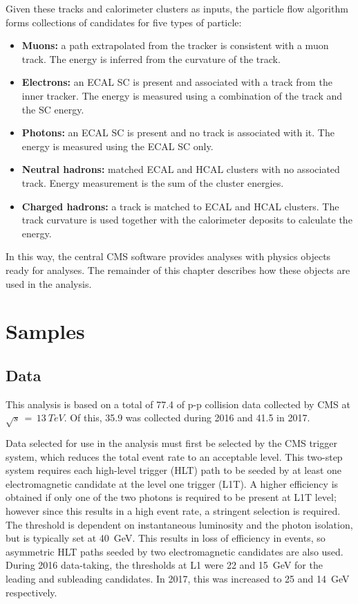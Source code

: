 \newpage
Given these tracks and calorimeter clusters as inputs, the particle flow algorithm forms collections of candidates for five types of particle:
\begin{itemize}
  \item{\textbf{Muons:} a path extrapolated from the tracker is consistent with a muon track. 
                        The energy is inferred from the curvature of the track.} %
  \item{\textbf{Electrons:} an ECAL SC is present and associated with a track from the inner tracker. 
                            The energy is measured using a combination of the track \pt and the SC energy.}
  \item{\textbf{Photons:} an ECAL SC is present and no track is associated with it.
                          The energy is measured using the ECAL SC only.}
  \item{\textbf{Neutral hadrons:} matched ECAL and HCAL clusters with no associated track.
                                 Energy measurement is the sum of the cluster energies.}
  \item{\textbf{Charged hadrons:} a track is matched to ECAL and HCAL clusters.
                                 The track curvature is used together with the calorimeter deposits to calculate the energy.}
\end{itemize}
In this way, the central CMS software provides analyses with physics objects ready for analyses.
The remainder of this chapter describes how these objects are used in the \Hgg analysis.

\section{Samples}
\subsection{Data}

This analysis is based on a total of \SI{77.4}{\fbinv} of p-p collision data collected by CMS at $\sqrt{s}\,=\,\SI{13}{TeV}$.
Of this, \SI{35.9}{\fbinv} was collected during 2016 and \SI{41.5}{\fbinv} in 2017.

Data selected for use in the analysis must first be selected by the CMS trigger system, 
which reduces the total event rate to an acceptable level.
This two-step system requires each high-level trigger (HLT) path to be seeded by at least one electromagnetic candidate at the level one trigger (L1T).
A higher efficiency is obtained if only one of the two photons is required to be present at L1T level; 
however since this results in a high event rate, a stringent \pt selection is required.
The threshold is dependent on instantaneous luminosity and the photon isolation, 
but is typically set at \SI{40}{GeV}.
This results in loss of efficiency in \Hgg events, so asymmetric HLT paths seeded by two electromagnetic candidates are also used.
During 2016 data-taking, the \pt thresholds at L1 were 22 and \SI{15}{GeV} for the leading and subleading candidates.
In 2017, this was increased to 25 and \SI{14}{GeV} respectively. %

